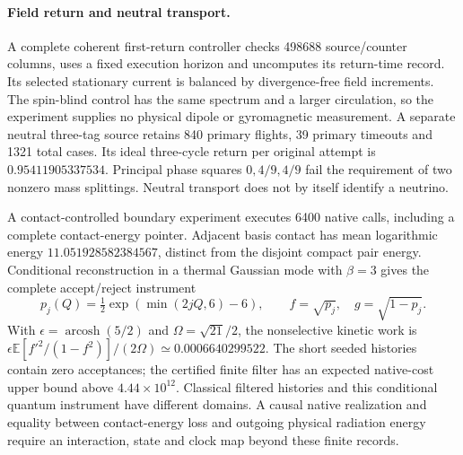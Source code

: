 \paragraph{Field return and neutral transport.}
A complete coherent first-return controller checks 498688 source/counter
columns, uses a fixed execution horizon and uncomputes its return-time
record. Its selected stationary current is balanced by divergence-free
field increments. The spin-blind control has the same spectrum and a
larger circulation, so the experiment supplies no physical dipole or
gyromagnetic measurement. A separate neutral three-tag source retains
840 primary flights, 39 primary timeouts and 1321 total cases. Its ideal
three-cycle return per original attempt is $0.95411905337534$.
Principal phase squares $0,4/9,4/9$ fail the requirement of two nonzero
mass splittings. Neutral transport does not by itself identify a neutrino.

A contact-controlled boundary experiment executes 6400 native calls,
including a complete contact-energy pointer. Adjacent basis contact has
mean logarithmic energy $11.051928582384567$, distinct from the disjoint
compact pair energy. Conditional reconstruction in a thermal Gaussian
mode with $\beta=3$ gives the complete accept/reject instrument
\[
 p_j(Q)=\tfrac12\exp(\min(2jQ,6)-6),\qquad
 f=\sqrt{p_j},\quad g=\sqrt{1-p_j}.
\]
With $\epsilon=\operatorname{arcosh}(5/2)$ and
$\Omega=\sqrt{21}/2$, the nonselective kinetic work is
$\epsilon\mathbb E[f'^2/(1-f^2)]/(2\Omega)
\simeq0.0006640299522$.
The short seeded histories contain zero acceptances; the certified finite
filter has an expected native-cost upper bound above $4.44\times10^{12}$.
Classical filtered histories and this conditional quantum instrument have
different domains. A causal native realization and equality between
contact-energy loss and outgoing physical radiation energy require an
interaction, state and clock map beyond these finite records.
